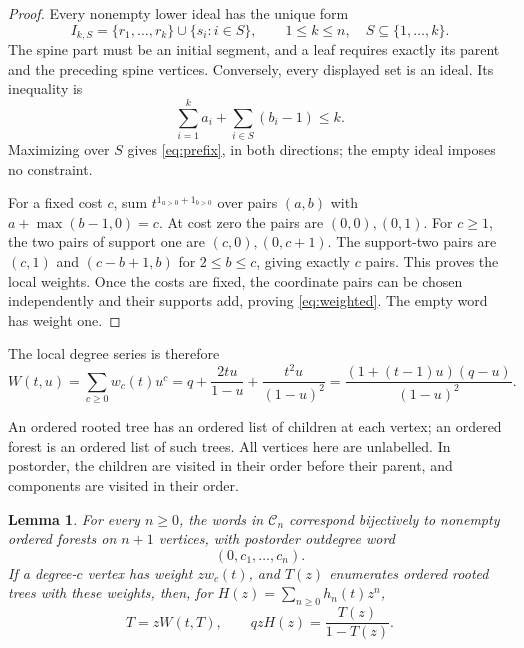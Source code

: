 \documentclass[11pt]{article}
\newtheorem{lemma}{Lemma}
\newcommand{\Cset}{\mathcal{C}}
\begin{document}
\begin{proof}
Every nonempty lower ideal has the unique form
\[
 I_{k,S}=\{r_1,\ldots,r_k\}\cup\{s_i:i\in S\},
 \qquad 1\leq k\leq n,\quad S\subseteq\{1,\ldots,k\}.
\]
The spine part must be an initial segment, and a leaf requires exactly its
parent and the preceding spine vertices. Conversely, every displayed set
is an ideal. Its inequality is
\[
 \sum_{i=1}^k a_i+\sum_{i\in S}(b_i-1)\leq k.
\]
Maximizing over $S$ gives \eqref{eq:prefix}, in both directions; the empty
ideal imposes no constraint.

For a fixed cost $c$, sum $t^{\mathrm{1}_{a>0}+\mathrm{1}_{b>0}}$ over pairs
$(a,b)$ with $a+\max(b-1,0)=c$. At cost zero the pairs are $(0,0),(0,1)$.
For $c\geq1$, the two pairs of support one are $(c,0),(0,c+1)$.
The support-two pairs are $(c,1)$ and $(c-b+1,b)$ for $2\leq b\leq c$,
giving exactly $c$ pairs. This proves the local weights. Once the costs
are fixed, the coordinate pairs can be chosen independently and their
supports add, proving \eqref{eq:weighted}. The empty word has weight one.
\end{proof}

The local degree series is therefore
\begin{equation}\label{eq:W}
 W(t,u)=\sum_{c\geq0}w_c(t)u^c
 =q+\frac{2tu}{1-u}+\frac{t^2u}{(1-u)^2}
 =\frac{(1+(t-1)u)(q-u)}{(1-u)^2}.
\end{equation}

An ordered rooted tree has an ordered list of children at each vertex;
an ordered forest is an ordered list of such trees. All vertices here are
unlabelled. In postorder, the children are visited in their order before
their parent, and components are visited in their order.

\begin{lemma}\label{lem:forest}
For every $n\geq0$, the words in $\Cset_n$ correspond bijectively to
nonempty ordered forests on $n+1$ vertices, with postorder outdegree word
\begin{equation}\label{eq:degrees}
 (0,c_1,\ldots,c_n).
\end{equation}
If a degree-$c$ vertex has weight $z w_c(t)$, and $T(z)$ enumerates ordered
rooted trees with these weights, then, for
$H(z)=\sum_{n\geq0}h_n(t)z^n$,
\begin{equation}\label{eq:forest}
 T=zW(t,T),\qquad qzH(z)=\frac{T(z)}{1-T(z)}.
\end{equation}
\end{lemma}
\end{document}
